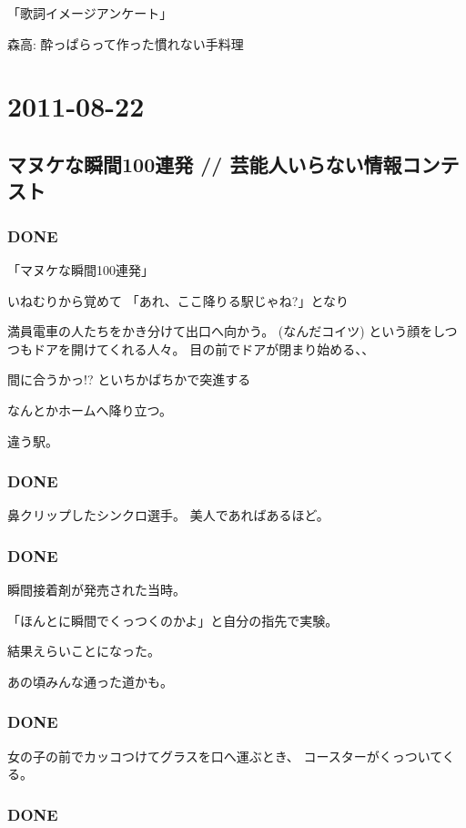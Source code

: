 \documentclass[11pt]{article}
\begin{document}
「歌詞イメージアンケート」

森高:
酔っぱらって作った慣れない手料理
\section{2011-08-22}
\label{sec-81}
\subsection{マヌケな瞬間100連発 // 芸能人いらない情報コンテスト}
\label{sec-81_1}
\subsubsection{\textbf{DONE}}
\label{sec-81_1_1}

「マヌケな瞬間100連発」

いねむりから覚めて
「あれ、ここ降りる駅じゃね?」となり

満員電車の人たちをかき分けて出口へ向かう。
(なんだコイツ) という顔をしつつもドアを開けてくれる人々。
目の前でドアが閉まり始める、、

間に合うかっ!? といちかばちかで突進する

なんとかホームへ降り立つ。

違う駅。
\subsubsection{\textbf{DONE}}
\label{sec-81_1_2}

鼻クリップしたシンクロ選手。
美人であればあるほど。
\subsubsection{\textbf{DONE}}
\label{sec-81_1_3}

瞬間接着剤が発売された当時。

「ほんとに瞬間でくっつくのかよ」と自分の指先で実験。

結果えらいことになった。

あの頃みんな通った道かも。
\subsubsection{\textbf{DONE}}
\label{sec-81_1_4}

女の子の前でカッコつけてグラスを口へ運ぶとき、
コースターがくっついてくる。
\subsubsection{\textbf{DONE}}
\label{sec-81_1_5}
\end{document}
